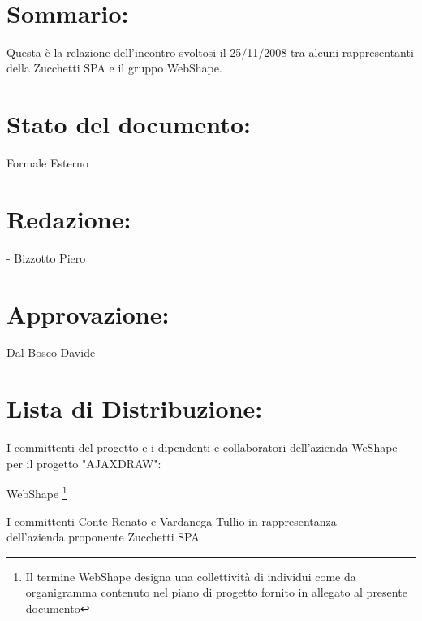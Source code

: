 \newpage

\begin{center} %
	\begin{Huge}	
				\textbf{\TITOLODOC}			\\
	\end{Huge}
\end{center}

\section*{\Large Sommario:} %
\indent \indent
Questa \`e la relazione dell'incontro svoltosi il 25$\slash$11$\slash$2008 tra alcuni rappresentanti della Zucchetti SPA e il gruppo WebShape.
\section*{\Large Stato del documento:}
\indent \indent
	Formale Esterno

\section*{\Large Redazione:}
	\begin{elencopuntato}[\normindent]
		\item[-] Bizzotto Piero
	\end{elencopuntato}

\section*{\Large Approvazione:}
	\begin{elencopuntato}[\normindent]
		\item Dal Bosco Davide
	\end{elencopuntato}
		
\section*{\Large Lista di Distribuzione:}
\indent \indent I committenti del progetto e i dipendenti e collaboratori dell'azienda WeShape per il progetto "AJAXDRAW":	

\begin{elenconumerato}{\normindent}
		\item WebShape \footnote{Il termine WebShape designa una collettivit\`a di individui come da organigramma contenuto nel piano di progetto fornito in allegato al presente documento}
		\item I committenti Conte Renato e Vardanega Tullio in rappresentanza \\  dell'azienda proponente Zucchetti SPA
	\end{elenconumerato}

